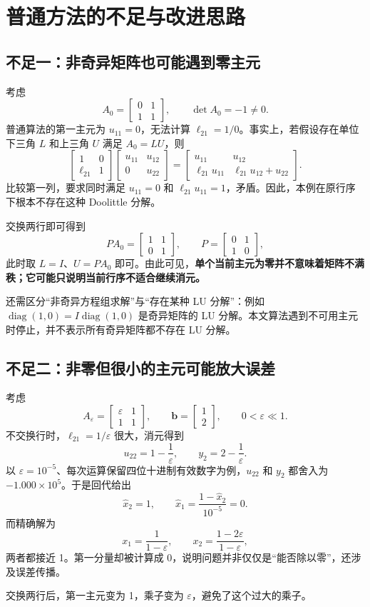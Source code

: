 \documentclass[UTF8,11pt,a4paper,fontset=fandol]{ctexart}
\newcommand{\mat}[1]{\begin{bmatrix}#1\end{bmatrix}}
\begin{document}
\section{普通方法的不足与改进思路}
\subsection{不足一：非奇异矩阵也可能遇到零主元}
考虑
\[
A_0=\mat{0&1\\1&1},\qquad \det A_0=-1\ne0.
\]
普通算法的第一主元为 $u_{11}=0$，无法计算 $\ell_{21}=1/0$。事实上，若假设存在单位下三角 $L$ 和上三角 $U$ 满足 $A_0=LU$，则
\[
\mat{1&0\\\ell_{21}&1}\mat{u_{11}&u_{12}\\0&u_{22}}
=\mat{u_{11}&u_{12}\\\ell_{21}u_{11}&\ell_{21}u_{12}+u_{22}}.
\]
比较第一列，要求同时满足 $u_{11}=0$ 和 $\ell_{21}u_{11}=1$，矛盾。因此，本例在原行序下根本不存在这种 Doolittle 分解。

交换两行即可得到
\[
P A_0=\mat{1&1\\0&1},\qquad P=\mat{0&1\\1&0},
\]
此时取 $L=I$、$U=PA_0$ 即可。由此可见，\textbf{单个当前主元为零并不意味着矩阵不满秩；它可能只说明当前行序不适合继续消元。}

还需区分“非奇异方程组求解”与“存在某种 LU 分解”：例如 $\operatorname{diag}(1,0)=I\operatorname{diag}(1,0)$ 是奇异矩阵的 LU 分解。本文算法遇到不可用主元时停止，并不表示所有奇异矩阵都不存在 LU 分解。

\subsection{不足二：非零但很小的主元可能放大误差}
考虑
\[
A_\varepsilon=\mat{\varepsilon&1\\1&1},\qquad
\mathbf b=\mat{1\\2},\qquad 0<\varepsilon\ll1.
\]
不交换行时，$\ell_{21}=1/\varepsilon$ 很大，消元得到
\[
u_{22}=1-\frac1\varepsilon,\qquad y_2=2-\frac1\varepsilon.
\]
以 $\varepsilon=10^{-5}$、每次运算保留四位十进制有效数字为例，$u_{22}$ 和 $y_2$ 都舍入为 $-1.000\times10^5$。于是回代给出
\[
\widehat x_2=1,
\qquad \widehat x_1=\frac{1-\widehat x_2}{10^{-5}}=0.
\]
而精确解为
\[
x_1=\frac1{1-\varepsilon},\qquad
x_2=\frac{1-2\varepsilon}{1-\varepsilon},
\]
两者都接近 1。第一分量却被计算成 0，说明问题并非仅仅是“能否除以零”，还涉及误差传播。

交换两行后，第一主元变为 1，乘子变为 $\varepsilon$，避免了这个过大的乘子。
\end{document}
